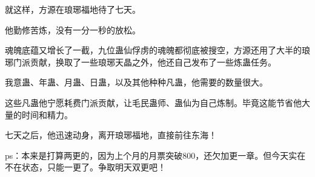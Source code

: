 \begin{this_body}
就这样，方源在琅琊福地待了七天。

他勤修苦炼，没有一分一秒的放松。

魂魄底蕴又增长了一截，九位蛊仙俘虏的魂魄都彻底被搜空，方源还用了大半的琅琊门派贡献，换取了一些琅琊天晶之外，他还自己发布了一些炼蛊任务。

我意蛊、年蛊、月蛊、日蛊，以及其他种种凡蛊，他需要的数量很大。

这些凡蛊他宁愿耗费门派贡献，让毛民蛊师、蛊仙为自己炼制。毕竟这能节省他大量的时间和精力。

七天之后，他迅速动身，离开琅琊福地，直接前往东海！

ps：本来是打算两更的，因为上个月的月票突破800，还欠加更一章。但今天实在不在状态，只能一更了。争取明天双更吧！

\end{this_body}

